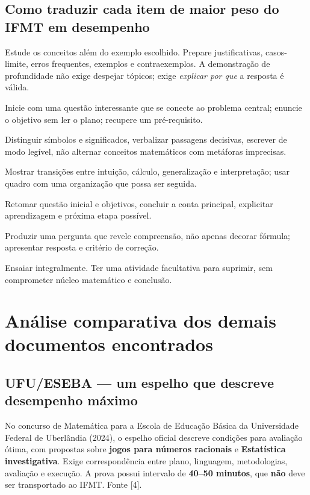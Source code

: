 \documentclass[11pt,a4paper]{article}
\begin{document}
\subsection{Como traduzir cada item de maior peso do IFMT em desempenho}
\begin{description}[style=nextline,leftmargin=0pt]
\item[20 pontos --- domínio do conteúdo.] Estude os conceitos além do exemplo escolhido. Prepare justificativas, casos-limite, erros frequentes, exemplos e contraexemplos. A demonstração de profundidade não exige despejar tópicos; exige \textit{explicar por que} a resposta é válida.
\item[10 pontos --- introdução.] Inicie com uma questão interessante que se conecte ao problema central; enuncie o objetivo sem ler o plano; recupere um pré-requisito.
\item[10 pontos --- linguagem.] Distinguir símbolos e significados, verbalizar passagens decisivas, escrever de modo legível, não alternar conceitos matemáticos com metáforas imprecisas.
\item[10 pontos --- sequência lógica.] Mostrar transições entre intuição, cálculo, generalização e interpretação; usar quadro com uma organização que possa ser seguida.
\item[10 pontos --- síntese.] Retomar questão inicial e objetivos, concluir a conta principal, explicitar aprendizagem e próxima etapa possível.
\item[5 pontos --- avaliação.] Produzir uma pergunta que revele compreensão, não apenas decorar fórmula; apresentar resposta e critério de correção.
\item[5 pontos --- tempo.] Ensaiar integralmente. Ter uma atividade facultativa para suprimir, sem comprometer núcleo matemático e conclusão.
\end{description}

\section{Análise comparativa dos demais documentos encontrados}
\subsection{UFU/ESEBA --- um espelho que descreve desempenho máximo}
No concurso de Matemática para a Escola de Educação Básica da Universidade Federal de Uberlândia (2024), o espelho oficial descreve condições para avaliação ótima, com propostas sobre \textbf{jogos para números racionais} e \textbf{Estatística investigativa}. Exige correspondência entre plano, linguagem, metodologias, avaliação e execução. A prova possui intervalo de \textbf{40--50 minutos}, que \textbf{não} deve ser transportado ao IFMT. Fonte [4].
\end{document}
